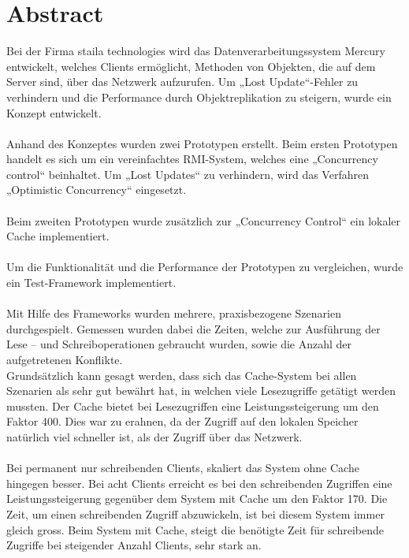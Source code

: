 \chapter*{Abstract}
Bei der Firma staila technologies wird das Datenverarbeitungssystem Mercury entwickelt, welches Clients ermöglicht, Methoden von Objekten, die auf dem Server sind, über das Netzwerk aufzurufen. Um „Lost Update“-Fehler zu verhindern und die Performance durch Objektreplikation zu steigern, wurde ein Konzept entwickelt.\\ \\
Anhand des Konzeptes wurden zwei Prototypen erstellt. Beim ersten Prototypen handelt es sich um ein vereinfachtes RMI-System, welches eine „Concurrency control“ beinhaltet. Um „Lost Updates“ zu verhindern, wird das Verfahren „Optimistic Concurrency“ eingesetzt. \\ \\
Beim zweiten Prototypen wurde zusätzlich zur „Concurrency Control“ ein lokaler Cache implementiert.\\ \\
Um die Funktionalität und die Performance der Prototypen zu vergleichen, wurde ein Test-Framework implementiert.\\ \\
Mit Hilfe des Frameworks wurden mehrere, praxisbezogene Szenarien durchgespielt. Gemessen wurden dabei die Zeiten, welche zur Ausführung der Lese – und Schreiboperationen gebraucht wurden, sowie die Anzahl der aufgetretenen Konflikte.\\
Grundsätzlich kann gesagt werden, dass sich das Cache-System bei allen Szenarien als sehr gut bewährt hat, in welchen viele Lesezugriffe getätigt werden mussten. Der Cache bietet bei Lesezugriffen eine Leistungssteigerung um den Faktor 400. Dies war zu erahnen, da der Zugriff auf den lokalen Speicher natürlich viel schneller ist, als der Zugriff über das Netzwerk.\\ \\
Bei permanent nur schreibenden Clients, skaliert das System ohne Cache hingegen besser. Bei acht Clients erreicht es bei den schreibenden Zugriffen eine Leistungssteigerung gegenüber dem System mit Cache um den Faktor 170. Die Zeit, um einen schreibenden Zugriff abzuwickeln, ist bei diesem System immer gleich gross. Beim System mit Cache, steigt die benötigte Zeit für schreibende Zugriffe bei steigender Anzahl Clients, sehr stark an.
